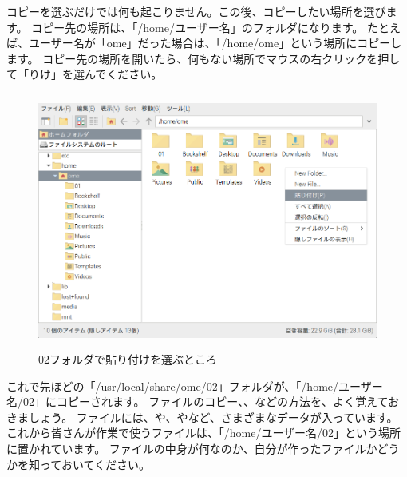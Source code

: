 \noindent
コピーを選ぶだけでは何も起こりません。この後、コピーしたい場所を選びます。
コピー先の場所は、「/home/ユーザー名」のフォルダになります。
たとえば、ユーザー名が「ome」だった場合は、「/home/ome」という場所にコピーします。
コピー先の場所を開いたら、何もない場所でマウスの右クリックを押して「りけ」を選んでください。

\begin{figure}[H]
  \begin{center}
    \includegraphics[keepaspectratio,width=11.232cm,height=8.424cm]{images/chap02/s_ome02c.png}
    \caption{02フォルダで貼り付けを選ぶところ}
  \end{center}
  \label{fig:folder_02paste}
\end{figure}

\noindent
これで先ほどの「/usr/local/share/ome/02」フォルダが、「/home/ユーザー名/02」にコピーされます。
ファイルのコピー、、などの方法を、よく覚えておきましょう。
ファイルには、や、やなど、さまざまなデータが入っています。
これから皆さんが作業で使うファイルは、「/home/ユーザー名/02」という場所に置かれています。
ファイルの中身が何なのか、自分が作ったファイルかどうかを知っておいてください。

